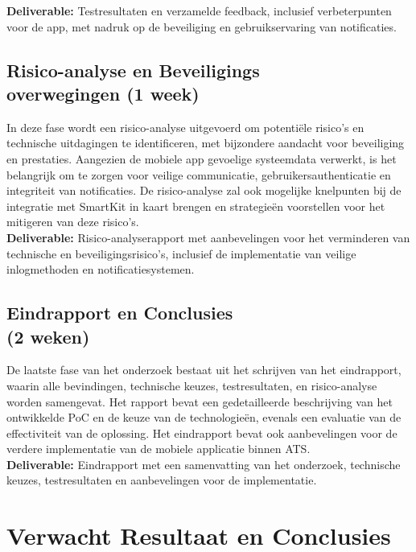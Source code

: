 \noindent \textbf{Deliverable:} Testresultaten en verzamelde feedback, inclusief verbeterpunten voor de app, met nadruk op de beveiliging en gebruikservaring van notificaties.

\subsection{Risico-analyse en Beveiligings\\overwegingen (1 week)}
\noindent In deze fase wordt een risico-analyse uitgevoerd om potentiële risico’s en technische uitdagingen te identificeren, met bijzondere aandacht voor beveiliging en prestaties. Aangezien de mobiele app gevoelige systeemdata verwerkt, is het belangrijk om te zorgen voor veilige communicatie, gebruikersauthenticatie en integriteit van notificaties. De risico-analyse zal ook mogelijke knelpunten bij de integratie met SmartKit in kaart brengen en strategieën voorstellen voor het mitigeren van deze risico’s. \\

\noindent \textbf{Deliverable:} Risico-analyserapport met aanbevelingen voor het verminderen van technische en beveiligingsrisico’s, inclusief de implementatie van veilige inlogmethoden en notificatiesystemen.

\subsection{Eindrapport en Conclusies \\(2 weken)}
\noindent De laatste fase van het onderzoek bestaat uit het schrijven van het eindrapport, waarin alle bevindingen, technische keuzes, testresultaten, en risico-analyse worden samengevat. Het rapport bevat een gedetailleerde beschrijving van het ontwikkelde PoC en de keuze van de technologieën, evenals een evaluatie van de effectiviteit van de oplossing. Het eindrapport bevat ook aanbevelingen voor de verdere implementatie van de mobiele applicatie binnen ATS. \\

\noindent \textbf{Deliverable:} Eindrapport met een samenvatting van het onderzoek, technische keuzes, testresultaten en aanbevelingen voor de implementatie.



\section{Verwacht Resultaat en Conclusies}
\label{sec:verwachte_resultaten}

